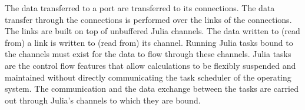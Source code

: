 \documentclass{juliacon}
\begin{document}

The data transferred to a port are transferred to its connections. The data transfer through the connections is performed over the links of the connections. The links are built on top of unbuffered Julia channels. The data written to (read from) a link is written to (read from) its channel. Running Julia tasks bound to the channels must exist for the data to flow through these channels. Julia tasks are the control flow features that allow calculations to be flexibly suspended and maintained without directly communicating the task scheduler of the operating system\cite{julialang}. The communication and the data exchange between the tasks are carried out through Julia's channels to which they are bound.

\end{document}
